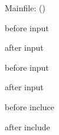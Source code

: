 \documentclass{article}
\begin{document}
Mainfile: \currfilename (\finkfile)

before input



after input


before input


after input


before incluce



after include
\end{document}
